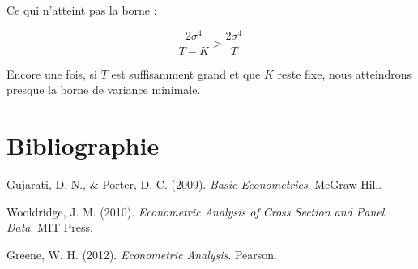 \documentclass[14pt]{extarticle} %
\begin{document}
Ce qui n’atteint pas la borne :

\[
\frac{2\sigma^4}{T - K} > \frac{2\sigma^4}{T}
\]

Encore une fois, si \(T\) est suffisamment grand et que \(K\) reste fixe, nous atteindrons presque la borne de variance minimale.

\section{Bibliographie}

\begin{thebibliography}{99}

Gujarati, D. N., \& Porter, D. C. (2009). \textit{Basic Econometrics}. McGraw-Hill.

Wooldridge, J. M. (2010). \textit{Econometric Analysis of Cross Section and Panel Data}. MIT Press.

Greene, W. H. (2012). \textit{Econometric Analysis}. Pearson.

\end{thebibliography}
\end{document}
